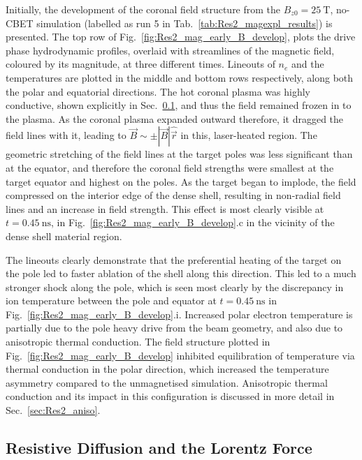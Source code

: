 Initially, the development of the coronal field structure from the $B_{z0}=25\ \text{T}$, no-\ac{CBET} simulation (labelled as run 5 in Tab.~\ref{tab:Res2_magexpl_results}) is presented.
The top row of Fig.~\ref{fig:Res2_mag_early_B_develop}, plots the drive phase hydrodynamic profiles, overlaid with streamlines of the magnetic field, coloured by its magnitude, at three different times.
Lineouts of $n_e$ and the temperatures are plotted in the middle and bottom rows respectively, along both the polar and equatorial directions.
The hot coronal plasma was highly conductive, shown explicitly in Sec.~\ref{sec:Res2_resis}, and thus the field remained frozen in to the plasma.
As the coronal plasma expanded outward therefore, it dragged the field lines with it, leading to $\vec{B}\sim\pm|\vec{B}|\hat{\vec{r}}$ in this, laser-heated region.
The geometric stretching of the field lines at the target poles was less significant than at the equator, and therefore the coronal field strengths were smallest at the target equator and highest on the poles.
As the target began to implode, the field compressed on the interior edge of the dense shell, resulting in non-radial field lines and an increase in field strength.
This effect is most clearly visible at $t=0.45\ \text{ns}$, in Fig.~\ref{fig:Res2_mag_early_B_develop}.c in the vicinity of the dense shell material region.

The lineouts clearly demonstrate that the preferential heating of the target on the pole led to faster ablation of the shell along this direction.
This led to a much stronger shock along the pole, which is seen most clearly by the discrepancy in ion temperature between the pole and equator at $t=0.45\ \text{ns}$ in Fig.~\ref{fig:Res2_mag_early_B_develop}.i.
Increased polar electron temperature is partially due to the pole heavy drive from the beam geometry, and also due to anisotropic thermal conduction.
The field structure plotted in Fig.~\ref{fig:Res2_mag_early_B_develop} inhibited equilibration of temperature via thermal conduction in the polar direction, which increased the temperature asymmetry compared to the unmagnetised simulation.
Anisotropic thermal conduction and its impact in this configuration is discussed in more detail in Sec.~\ref{sec:Res2_aniso}.

\subsection{Resistive Diffusion and the Lorentz Force}%
\label{sec:Res2_resis}

